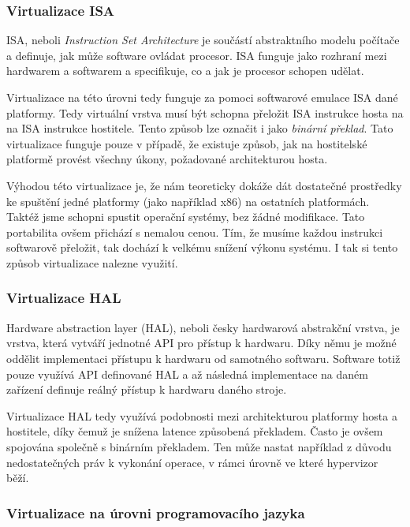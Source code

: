 \subsubsection{Virtualizace ISA}

ISA, neboli \textit{Instruction Set Architecture} je součástí abstraktního modelu počítače a definuje, jak může software ovládat procesor. ISA funguje jako rozhraní mezi hardwarem a softwarem a specifikuje, co a jak je procesor schopen udělat.\,\cite{isa-arm}

Virtualizace na této úrovni tedy funguje za pomoci softwarové emulace ISA dané platformy. Tedy virtuální vrstva musí být schopna přeložit ISA instrukce hosta na na ISA instrukce hostitele. Tento způsob lze označit i jako \textit{binární překlad}. Tato virtualizace funguje pouze v případě, že existuje způsob, jak na hostitelské platformě provést všechny úkony, požadované architekturou hosta. 

Výhodou této virtualizace je, že nám teoreticky dokáže dát dostatečné prostředky ke spuštění jedné platformy (jako například x86) na ostatních platformách. Taktéž jsme schopni spustit operační systémy, bez žádné modifikace. Tato portabilita ovšem přichází s nemalou cenou. Tím, že musíme každou instrukci softwarově přeložit, tak dochází k velkému snížení výkonu systému. I tak si tento způsob virtualizace nalezne využití. \cite{chiueh2005survey}\cite{RODRIGUEZHARO2012267}


\subsubsection{Virtualizace HAL}

Hardware abstraction layer (HAL), neboli česky hardwarová abstrakční vrstva, je vrstva, která vytváří jednotné API pro přístup k hardwaru. Díky němu je možné oddělit implementaci přístupu k hardwaru od samotného softwaru. Software totiž pouze využívá API definované HAL a až následná implementace na daném zařízení definuje reálný přístup k hardwaru daného stroje. \cite{haldef}

Virtualizace HAL tedy využívá podobnosti mezi architekturou platformy hosta a hostitele, díky čemuž je snížena latence způsobená překladem. Často je ovšem spojována společně s binárním překladem. Ten může nastat například z důvodu nedostatečných práv k vykonání operace, v rámci úrovně ve které hypervizor běží. \cite{chiueh2005survey}\cite{vcc_2}


\subsubsection{Virtualizace na úrovni programovacího jazyka}

